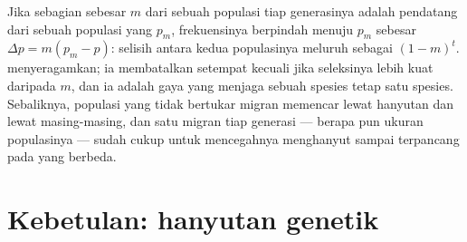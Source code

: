 \begin{proposition}\label{prop:b2:population-genetics:migration}
Jika sebagian sebesar $m$ dari sebuah populasi tiap generasinya adalah
pendatang dari sebuah populasi yang  $p_{m}$,
frekuensinya berpindah menuju $p_{m}$ sebesar $\Delta p = m(p_{m} - p)$: selisih antara kedua populasinya meluruh sebagai $(1 - m)^{t}$.
\emph{} menyeragamkan; ia membatalkan  setempat
kecuali jika seleksinya lebih kuat daripada $m$, dan ia adalah gaya
yang menjaga sebuah spesies tetap satu spesies. Sebaliknya, populasi
yang tidak bertukar migran memencar lewat hanyutan dan lewat 
masing-masing, dan satu migran tiap generasi --- berapa pun ukuran
populasinya --- sudah cukup untuk mencegahnya menghanyut sampai
terpancang pada  yang berbeda.
\end{proposition}

\section{Kebetulan: hanyutan genetik}


